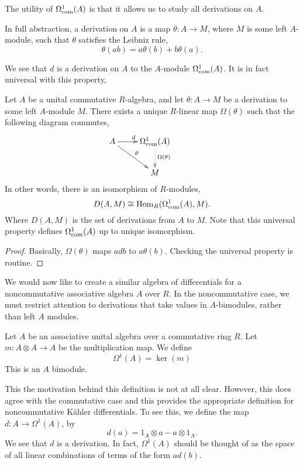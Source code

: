 The utility of $\Omega^1_{\operatorname{com}}(A)$ is that it allows us to study all
derivations on $A$. 

In full abstraction, a derivation on $A$ is a map $\theta:A\rightarrow M$, where
$M$ is some left $A$-module, such that $\theta$ satisfies the Leibniz rule,
\begin{equation*}
    \theta(ab) = a\theta(b)+b\theta(a).
\end{equation*}

We see that $d$ is a derivation on $A$ to the $A$-module $\Omega^1_{\operatorname{com}}(A)$.
It is in fact universal with this property,
\begin{theorem}
    Let $A$ be a unital commutative $R$-algebra, and let $\theta:A\rightarrow M$
    be a derivation to some left $A$-module $M$. There exists a unique $R$-linear 
    map $\Omega(\theta)$ such that the following diagram commutes,\\
    \begin{displaymath}
    \xymatrix{
        A \ar[r]^d \ar[rd]^\theta & 
        \Omega^1_{\com}(A) \ar@{.>}[d]^{\Omega(\theta)} &\\
         &
        M
    } 
  \end{displaymath}
  In other words, there is an isomorphism of $R$-modules,
  \begin{equation*}
    D(A,M) \cong \operatorname{Hom}_R(\Omega^1_{\operatorname{com}}(A),M).
  \end{equation*}
  Where $D(A,M)$ is the set of derivations from $A$ to $M$.
  Note that this universal property defines $\Omega^1_{\operatorname{com}}(A)$ up
  to unique isomorphism.
\end{theorem}
\begin{proof}
    Basically, $\Omega(\theta)$ maps $adb$ to $a\theta(b)$. Checking the universal property
    is routine.
\end{proof}

We would now like to create a similar algebra of differentials for a noncommutative
associative algebra $A$ over $R$. In the noncommutative case, we must restrict
attention to derivations that take values in $A$-bimodules, rather than left
$A$ modules.
\begin{definition}
    Let $A$ be an associative
    unital algebra over a commutative ring $R$. 
    Let $m:A\otimes A\rightarrow A$ be the multiplication map. We define
    \begin{equation*}
        \Omega^1(A) = \ker(m)
    \end{equation*}
    This is an $A$ bimodule.
\end{definition}
This the motivation behind this definition is not at all clear. However, this
does agree with the commutative case and this provides the appropriate definition
for noncommutative K\"ahler differentials. To see this, we define the map
$d:A\rightarrow \Omega^1(A)$, by
\begin{equation*}
    d(a) = 1_A\otimes a-a\otimes 1_A.
\end{equation*}
We see that $d$ is a derivation. In fact, $\Omega^1(A)$
should be thought of as the space of all linear combinations
of terms of the form $ad(b)$.


